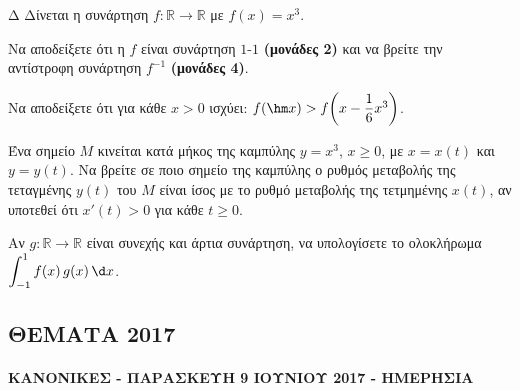 \begin{thema}{Δ}
Δίνεται η συνάρτηση $f : \mathbb{R} \to \mathbb{R}$ με $f(x) = x^3$.
\begin{erwthma}
    \item Να αποδείξετε ότι η $f$ είναι συνάρτηση $1$-$1$ \textbf{(μονάδες 2)} και να βρείτε την αντίστροφη συνάρτηση $f^{-1}$ \textbf{(μονάδες 4)}. 
    \item Να αποδείξετε ότι για κάθε $x > 0$ ισχύει: $f(\hm x) > f\!\left(x - \dfrac{1}{6}x^3\right)$. 
    \item Ένα σημείο $M$ κινείται κατά μήκος της καμπύλης $y = x^3$, $x \geq 0$, με $x = x(t)$ και $y = y(t)$. Να βρείτε σε ποιο σημείο της καμπύλης ο ρυθμός μεταβολής της τεταγμένης $y(t)$ του $M$ είναι ίσος με το ρυθμό μεταβολής της τετμημένης $x(t)$, αν υποτεθεί ότι $x'(t) > 0$ για κάθε $t \geq 0$. 
    \item Αν $g : \mathbb{R} \to \mathbb{R}$ είναι συνεχής και άρτια συνάρτηση, να υπολογίσετε το ολοκλήρωμα $\displaystyle\int_{-1}^{1} f(x)\,g(x)\,\d x$. 
\end{erwthma}
\end{thema}


\subsection{ΘΕΜΑΤΑ 2017}
\paragraph{ΚΑΝΟΝΙΚΕΣ - ΠΑΡΑΣΚΕΥΗ 9 ΙΟΥΝΙΟΥ 2017 - ΗΜΕΡΗΣΙΑ}

